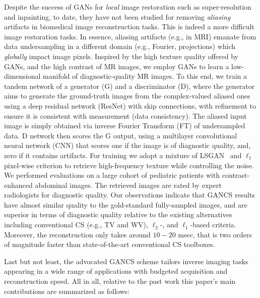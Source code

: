 \documentclass{journal}
\begin{document}
Despite the success of GANs for {\it local} image restoration such as super-resolution and inpainting, to date, they have not been studied for removing {\it aliasing} artifacts in biomedical image reconstruction tasks. This is indeed a more difficult image restoration tasks. In essence, aliasing artifacts (e.g., in MRI) emanate from data undersampling in a different domain (e.g., Fourier, projections) which {\it globally} impact image pixels. Inspired by the high texture quality offered by GANs, and the high contrast of MR images, we employ GANs to learn a low-dimensional manifold of diagnostic-quality MR images. To this end, we train a tandem network of a generator (G) and a discriminator (D), where the generator aims to generate the ground-truth images from the complex-valued aliased ones using a deep residual network (ResNet) with skip connections, with refinement to ensure it is consistent with measurement (data consistency). The aliased input image is simply obtained via inverse Fourier Transform (FT) of undersampled data. D network then scores the G output, using a multilayer convolutional neural network (CNN) that scores one if the image is of diagnostic quality, and, zero if it contains artifacts. For training we adopt a mixture of LSGAN~\cite{lsgan2017} and $\ell_1$ pixel-wise criterion to retrieve high-frequency texture while controlling the noise. We performed evaluations on a large cohort of pediatric patients with contrast-enhanced abdominal images. The retrieved images are rated by expert radiologists for diagnostic quality. Our observations indicate that GANCS results have almost similar quality to the gold-standard fully-sampled images, and are superior in terms of diagnostic quality relative to the existing alternatives including conventional CS (e.g., TV and WV), $\ell_2$-, and $\ell_1$-based criteria. Moreover, the reconstruction only takes around $10-20$ msec, that is two orders of magnitude faster than state-of-the-art conventional CS toolboxes. 


Last but not least, the advocated GANCS scheme tailors inverse imaging tasks appearing in a wide range of applications with budgeted acquisition and reconstruction speed. All in all, relative to the past work this paper's main contributions are summarized as follows:
\end{document}
